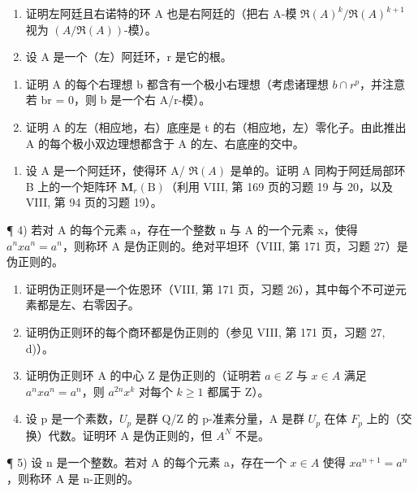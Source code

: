 
\begin{enumerate}
\def\labelenumi{\arabic{enumi})}
\item
  证明左阿廷且右诺特的环 A 也是右阿廷的（把右 A-模 \(\Re(A)^{k}/\Re(A)^{k+1}\) 视为 \((A/\Re(A))\)-模）。
\item
  设 A 是一个（左）阿廷环，r 是它的根。
\end{enumerate}

\begin{enumerate}
\def\labelenumi{\alph{enumi})}
\item
  证明 A 的每个右理想 b 都含有一个极小右理想（考虑诸理想 \(b \cap r^{p}\)，并注意若 br = 0，则 b 是一个右 A/r-模）。
\item
  证明 A 的左（相应地，右）底座是 t 的右（相应地，左）零化子。由此推出 A 的每个极小双边理想都含于 A 的左、右底座的交中。
\end{enumerate}

\begin{enumerate}
\def\labelenumi{\arabic{enumi})}
\setcounter{enumi}{2}
\tightlist
\item
  设 A 是一个阿廷环，使得环 A/ \(\Re(A)\) 是单的。证明 A 同构于阿廷局部环 B 上的一个矩阵环 \(\mathbf{M}_{r}(\mathrm{B})\)（利用 VIII, 第 169 页的习题 19 与 20，以及 VIII, 第 94 页的习题 19）。
\end{enumerate}

¶ 4) 若对 A 的每个元素 a，存在一个整数 n 与 A 的一个元素 x，使得 \(a^{n}xa^{n}=a^{n}\)，则称环 A 是伪正则的。绝对平坦环（VIII, 第 171 页，习题 27）是伪正则的。

\begin{enumerate}
\def\labelenumi{\alph{enumi})}
\item
  证明伪正则环是一个佐恩环（VIII, 第 171 页，习题 26），其中每个不可逆元素都是左、右零因子。
\item
  证明伪正则环的每个商环都是伪正则的（参见 VIII, 第 171 页，习题 27, d)）。
\item
  证明伪正则环 A 的中心 Z 是伪正则的（证明若 \(a \in Z\) 与 \(x \in A\) 满足 \(a^{n}xa^{n} = a^{n}\)，则 \(a^{2n}x^{k}\) 对每个 \(k \geqslant 1\) 都属于 Z）。
\item
  设 p 是一个素数，\(U_{p}\) 是群 Q/Z 的 p-准素分量，A 是群 \(U_{p}\) 在体 \(F_{p}\) 上的（交换）代数。证明环 A 是伪正则的，但 \(A^{N}\) 不是。
\end{enumerate}

¶ 5) 设 n 是一个整数。若对 A 的每个元素 a，存在一个 \(x \in A\) 使得 \(xa^{n+1} = a^n\)，则称环 A 是 n-正则的。

